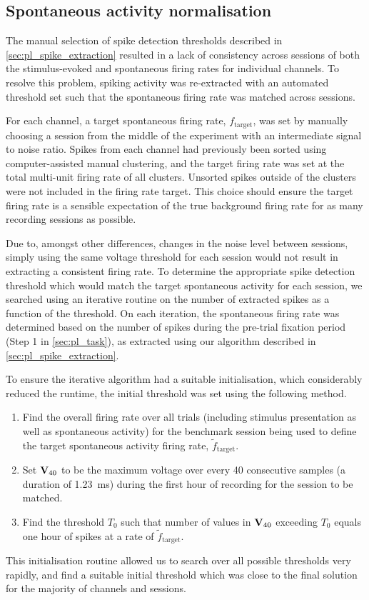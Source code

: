 \subsection{Spontaneous activity normalisation}
\label{sec:pl_san}

The manual selection of spike detection thresholds described in \autoref{sec:pl_spike_extraction} resulted in a lack of consistency across sessions of both the stimulus-evoked and spontaneous firing rates for individual channels.
To resolve this problem, spiking activity was re-extracted with an automated threshold set such that the spontaneous firing rate was matched across sessions.

For each channel, a target spontaneous firing rate, $f_\text{target}$, was set by manually choosing a session from the middle of the experiment with an intermediate signal to noise ratio.
Spikes from each channel had previously been sorted using computer-assisted manual clustering, and the target firing rate was set at the total multi-unit firing rate of all clusters.
Unsorted spikes outside of the clusters were not included in the firing rate target.
This choice should ensure the target firing rate is a sensible expectation of the true background firing rate for as many recording sessions as possible.

Due to, amongst other differences, changes in the noise level between sessions, simply using the same voltage threshold for each session would not result in extracting a consistent firing rate.
To determine the appropriate spike detection threshold which would match the target spontaneous activity for each session, we searched using an iterative routine on the number of extracted spikes as a function of the threshold.
On each iteration, the spontaneous firing rate was determined based on the number of spikes during the pre-trial fixation period (Step \num{1} in \autoref{sec:pl_task}), as extracted using our algorithm described in \autoref{sec:pl_spike_extraction}.

To ensure the iterative algorithm had a suitable initialisation, which considerably reduced the runtime, the initial threshold was set using the following method.
\begin{enumerate}
\item Find the overall firing rate over all trials (including stimulus presentation as well as spontaneous activity) for the benchmark session being used to define the target spontaneous activity firing rate, $\tilde{f}_\text{target}$.
\item Set $\mathbf{V}_{40}$ to be the maximum voltage over every \num{40} consecutive samples (a duration of \SI{1.23}{\milli\second}) during the first hour of recording for the session to be matched.
\item Find the threshold $T_0$ such that number of values in $\mathbf{V}_{40}$ exceeding $T_0$ equals one hour of spikes at a rate of $\tilde{f}_\text{target}$.
\end{enumerate}
This initialisation routine allowed us to search over all possible thresholds very rapidly, and find a suitable initial threshold which was close to the final solution for the majority of channels and sessions.

